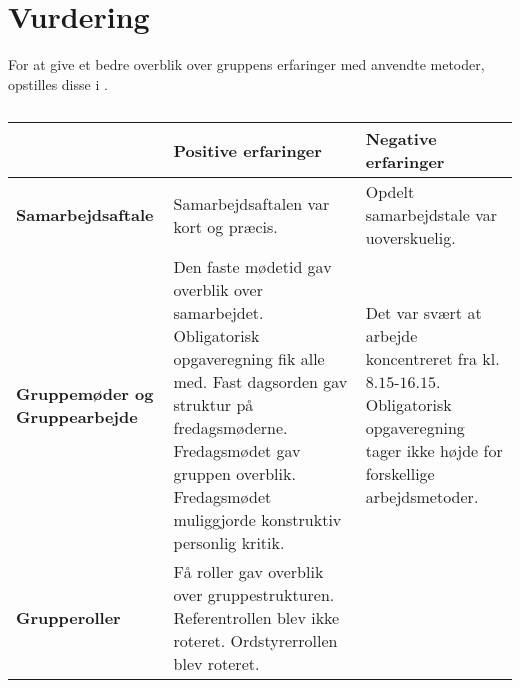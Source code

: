 \section{Vurdering}
For at give et bedre overblik over gruppens erfaringer med anvendte metoder, opstilles disse i .

\begin{table}[h]
	\caption{}
	\label{Samvur}
	\begin{tabular}{|p{3.5cm}|p{5cm}|p{5cm}|}
		
		\hline
    	&\textbf{Positive erfaringer}                               &  \textbf{Negative erfaringer}                                                               \\ \hline
		\textbf{Samarbejdsaftale}          
	   &  
		    	Samarbejdsaftalen var kort og præcis.                &  Opdelt samarbejdstale var uoverskuelig.                  \\ \hline
		\textbf{Gruppemøder og Gruppearbejde} &  
		        Den faste mødetid gav overblik over samarbejdet.                                                                                                       \newline
		     	Obligatorisk opgaveregning fik alle med.                                            \newline
		     	Fast dagsorden gav struktur på fredagsmøderne.                                                                                           \newline
		        Fredagsmødet gav gruppen overblik.                                                                                        \newline
		        Fredagsmødet muliggjorde konstruktiv personlig kritik.
		                                                           &   Det var svært at arbejde koncentreret fra kl. $8.15$-$16.15$.                                     \newline
		                                                    	       Obligatorisk opgaveregning tager ikke højde for forskellige arbejdsmetoder.         \\ \hline
		\textbf{Grupperoller}                         &
		       Få roller gav overblik over gruppestrukturen.
		       Referentrollen blev ikke roteret.                                                                                                                       \newline
			   Ordstyrerrollen blev roteret.                                                                                                  \newline

\end{tabular}
\end{table}
